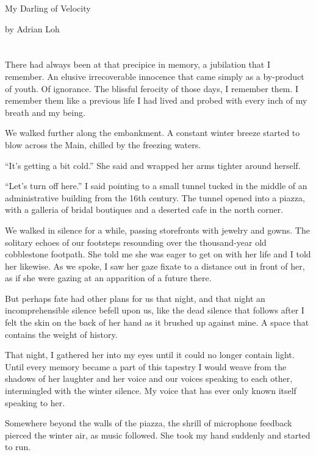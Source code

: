 \documentclass[11pt]{article}
\newcommand{\ga}[1]{\fontspec[Ligatures={Common}]{Acanthus-Italic}\fontsize{46pt}{50pt}\selectfont #1}
\begin{document}
\begin{center}\ga{My Darling of Velocity}\end{center}
\begin{center}by Adrian Loh\end{center}

\section{} %
\label{sec:section_name}

	There had always been at that precipice in memory, a jubilation that I remember.
An elusive irrecoverable innocence that came simply as a by-product of youth. Of
ignorance. The blissful ferocity of those days, I remember them. I remember them
like a previous life I had lived and probed with every inch of my breath and my
being.

	We walked further along the embankment. A constant winter breeze started to blow
across the Main, chilled by the freezing waters.

	``It’s getting a bit cold.'' She said and wrapped her arms tighter around
herself.

	``Let’s turn off here.'' I said pointing to a small tunnel tucked in the middle
of an administrative building from the 16th century. The tunnel opened into a
piazza, with a galleria of bridal boutiques and a deserted cafe in the north
corner.

	We walked in silence for a while, passing storefronts with jewelry and gowns.
The solitary echoes of our footsteps resounding over the thousand-year old
cobblestone footpath. She told me she was eager to get on with her life and I
told her likewise. As we spoke, I saw her gaze fixate to a distance out in front
of her, as if she were gazing at an apparition of a future there.

	But perhaps fate had other plans for us that night, and that night an
incomprehensible silence befell upon us, like the dead silence that follows
after I felt the skin on the back of her hand as it brushed up against mine. A
space that contains the weight of history.

	That night, I gathered her into my eyes until it could no longer contain light.
Until every memory became a part of this tapestry I would weave from the shadows
of her laughter and her voice and our voices speaking to each other,
intermingled with the winter silence. My voice that has ever only known itself
speaking to her.

	Somewhere beyond the walls of the piazza, the shrill of microphone feedback
pierced the winter air, as music followed. She took my hand suddenly and started
to run.
\end{document}

